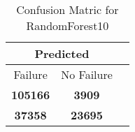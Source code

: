 \begin{table}[] 
\caption{Confusion Matric for RandomForest10} 
\label{Table: Prediction Accuracy-NoneRandomForest10OnlySunEKF-ignoreReflection100.9EKF-top2-Reflection} 
\centering 
\begin{tabular} 
 {@{}ccc@{}} 
\toprule 
\multicolumn{2}{c}{\textbf{Predicted}}
 \\ \midrule 
\multicolumn{1}{|c|}{Failure} & 
\multicolumn{1}{c|}{No Failure}
 \\ \midrule 
\multicolumn{1}{|c|}{\color{green}\textbf{105166}} & 
\multicolumn{1}{c|}{\color{red}\textbf{3909}}
 \\ \midrule 
\multicolumn{1}{|c|}{\color{red}\textbf{37358}} & 
\multicolumn{1}{c|}{\color{green}\textbf{23695}}
 \\ \bottomrule 
\end{tabular} 
\end{table} 
